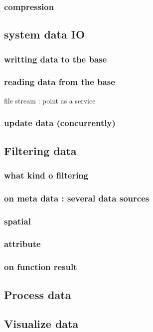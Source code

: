 		\subsubsection{compression}
		\subsection{system data IO}
		\subsubsection{writting data to the base}
		\subsubsection{reading data from the base}
 			file
 			stream : point as a service
		\subsubsection{update data (concurrently) }
	\subsection{Filtering data } 
		\subsubsection{what kind o filtering}
		\subsubsection{on meta data : several data sources}
		\subsubsection{spatial}
		\subsubsection{attribute}
		\subsubsection{on function result} 
	\subsection{Process data}
	\subsection{Visualize data}